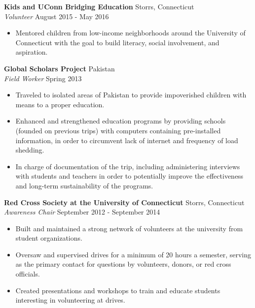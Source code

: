 \documentclass{article}
\newcommand{\n}{\\ \noindent \normalsize}
\newcommand{\nl}{\noindent \normalsize}
\begin{document}
	\nl \textbf{Kids and UConn Bridging Education} \hfill Storrs, Connecticut
	\n \textit{Volunteer} \hfill August 2015 - May 2016
		\begin{itemize}
			\item Mentored children from low-income neighborhoods around the University of Connecticut with the goal to build literacy, social involvement, and aspiration.
		\end {itemize}
		
	\nl \textbf{Global Scholars Project} \hfill Pakistan
		\n \textit{Field Worker} \hfill Spring 2013
			\begin{itemize}
				\item Traveled to isolated areas of Pakistan to provide impoverished children with means to a proper education.
				\vspace{-2.5mm} \item Enhanced and strengthened education programs by providing schools (founded on previous trips) with computers containing pre-installed information, in order to circumvent lack of internet and frequency of load shedding.
				\vspace{-2.5mm} \item In charge of documentation of the trip, including administering interviews with students and teachers in order to potentially improve the effectiveness and long-term sustainability of the programs.
			\end {itemize}
			
	
	\nl \textbf{Red Cross Society at the University of Connecticut} \hfill Storrs, Connecticut
	\n \textit{Awareness Chair} \hfill September 2012 - September 2014
		\begin{itemize}
			\item Built and maintained a strong network of volunteers at the university from student organizations. 
			\vspace{-2.5mm} \item Oversaw and supervised drives for a minimum of 20 hours a semester, serving as the primary contact for questions by volunteers, donors, or red cross officials. 
			\vspace{-2.5mm} \item Created presentations and workshops to train and educate students interesting in volunteering at drives. 
		\end{itemize}

	\vspace{-3.5mm}	
\end{document}

